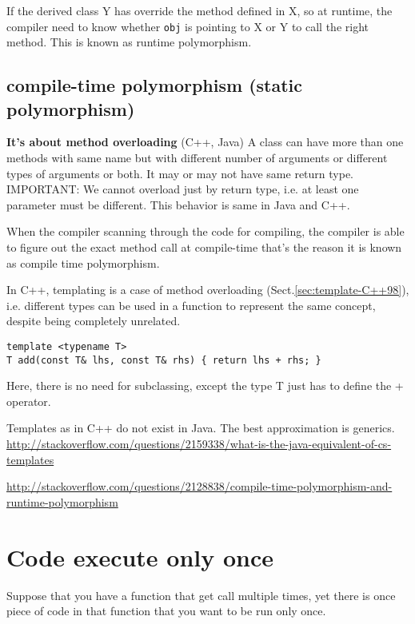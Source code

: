 If the derived class Y has override the method defined in X, so at runtime, the
compiler need to know whether \verb!obj! is pointing to X or Y to call the right
method. This is known as runtime polymorphism.

\subsection{compile-time polymorphism (static polymorphism)}
\label{sec:polymorphism-static}
\label{sec:compile-time-polymorphism}

{\bf It's about method overloading} (C++, Java)
A class can have more than one methods with same name but with different number
of arguments or different types of arguments or both. 
It may or may not have same return type. IMPORTANT: We cannot overload just by
return type, i.e. at least one parameter must be different. This behavior is
same in Java and C++.

When the compiler scanning through the code for compiling, the compiler is able
to figure out the exact method call at compile-time that's the reason it is
known as compile time polymorphism.

In C++, templating is a case of method overloading
(Sect.\ref{sec:template-C++98}), i.e. different types can be used in a function
to represent the same concept, despite being completely unrelated.
\begin{lstlisting}
template <typename T>
T add(const T& lhs, const T& rhs) { return lhs + rhs; }
\end{lstlisting}
Here, there is no need for subclassing, except the type T just has to define
the + operator. 

\begin{mdframed}
Templates as in C++ do not exist in Java. The best approximation is generics.
\url{http://stackoverflow.com/questions/2159338/what-is-the-java-equivalent-of-cs-templates}
\end{mdframed}

\url{http://stackoverflow.com/questions/2128838/compile-time-polymorphism-and-runtime-polymorphism}

\section{Code execute only once}

Suppose that you have a function that get call multiple times, yet there is once
piece of code in that function that you want to be run only once.

